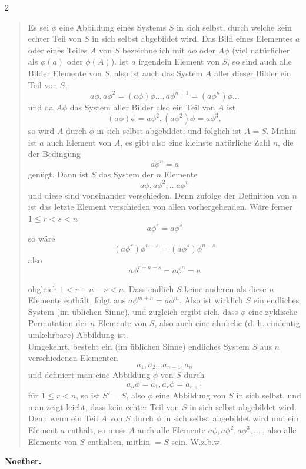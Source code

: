 \documentclass[leqno,hidelinks,10pt]{article}
\theoremstyle{definition}
\begin{document}
\begin{paracol}{2}
\begin{leftcolumn}
\begin{quote}
\hspace{12pt} Es sei $\phi$ eine Abbildung eines Systems $S$ in sich selbst, durch
welche kein echter Teil von $S$ in sich selbst abgebildet wird. Das Bild eines
Elementes $a$ oder eines Teiles $A$ von $S$ bezeichne ich mit $a\phi$ oder $A\phi$
(viel natürlicher als $\phi(a)$ oder $\phi(A)$). Ist $a$ irgendein Element von $S$,
so sind auch alle Bilder Elemente von $S$, also ist auch das System $A$ aller dieser
Bilder ein Teil von $S$,
\[
    a\phi, a\phi^2= (a\phi)\phi \ldots, a\phi^{n+1} = (a\phi^n)\phi \ldots
\]
und da $A\phi$ das System aller Bilder also ein Teil von $A$ ist,
\[
    (a\phi) \phi = a\phi^2, (a\phi^2)\phi = a\phi^3,
\]
so wird $A$ durch $\phi$ in sich selbst abgebildet; und folglich ist $A = S$.
Mithin ist $a$ auch Element von $A$,  es gibt also eine kleinste natürliche Zahl
$n$, die der Bedingung%
\[
    a\phi^n = a
\]
genügt. Dann ist $S$ das System der $n$ Elemente
\[
    a\phi,a\phi^2,\ldots a\phi^n
\]
und diese sind voneinander verschieden. Denn zufolge der Definition von $n$ ist das
letzte Element verschieden von allen vorhergehenden. Wäre ferner $1 \leq r<s < n$%
\[
    a\phi^r = a\phi^s
\]
so wäre \smallskip
\[
    (a\phi^r)\phi^{n-s} = (a\phi^s) \phi^{n-s}
\]
also \smallskip
\[
    a\phi^{r+n-s} = a\phi^n = a
\]

\noindent obgleich $1 < r + n - s < n$. Dass endlich $S$ keine anderen als diese $n$ Elemente
enthält, folgt aus $a\phi^{m + n} = a\phi^m$. Also ist wirklich $S$ ein endliches
System (im üblichen Sinne), und zugleich ergibt sich, dass $\phi$ eine zyklische
Permutation der $n$ Elemente von $S$, also auch eine ähnliche (d. h. eindeutig
umkehrbare) Abbildung ist. \\

\hspace{12pt} Umgekehrt, besteht ein (im üblichen Sinne) endliches System $S$ aus
$n$ verschiedenen Elementen
\[
    a_1, a_2 \ldots a_{n-1}, a_n
\]
und definiert man eine Abbildung $\phi$ von $S$ durch
\[
    a_n\phi = a_1, a_r\phi = a_{r+1}
\]
für $1 \leq r < n$, so ist $S' = S$, also $\phi$ eine Abbildung von $S$ in sich
selbst, und man zeigt leicht, dass kein echter Teil von $S$ in sich selbst
abgebildet wird. Denn wenn ein Teil $A$ von $S$ durch $\phi$ in sich selbst
abgebildet wird und ein Element $a$ enthält, so muss $A$ auch alle Elemente
$a\phi, a\phi^2, a\phi^3, \ldots\ $, also alle Elemente von $S$ enthalten,
mithin $= S$ sein. W.z.b.w.\grqq{}
\end{quote}

\begin{flushright} \textbf{Noether.}\end{flushright}



\end{leftcolumn}
\end{paracol}
\end{document}
